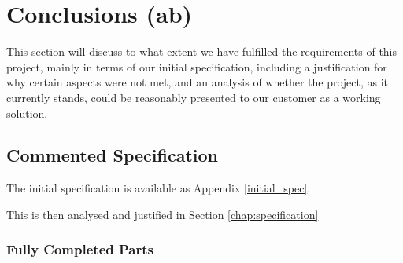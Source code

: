 \chapter{Conclusions (ab)}

This section will discuss to what extent we have fulfilled the requirements 
of this project, mainly in terms of our initial specification, including a 
justification for why certain aspects were not met, and an analysis of 
whether the project, as it currently stands, could be reasonably presented to our customer as a working solution.

\section{Commented Specification}

The initial specification is available as Appendix \ref{initial_spec}. 

This is then analysed and justified in Section \ref{chap:specification}

\subsection{Fully Completed Parts}

